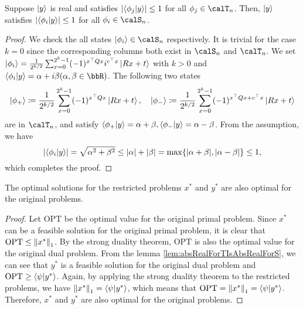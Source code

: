 \documentclass[\main/main]{subfiles}
\begin{document}
\begin{lemma}{\label{lem:absRealForTIsAbsRealForS}}
    Suppose $\ket{y}$ is real and satisfies $\abs{\braket{\phi_j}{y}} \leq 1$ for all $\phi_j \in \calT_n$.
    Then, $\ket{y}$ satisfies $\abs{\braket{\phi_i}{y}} \leq 1$ for all $\phi_i \in \calS_n$.
\end{lemma}
\begin{proof}
    We check the all states $\ket{\phi_i} \in \calS_n$ respectively.
    It is trivial for the case $k=0$ since the corresponding columns both exist in $\calS_n$ and $\calT_n$.
    We set $\ket{\phi_i} = \frac{1}{2^{k/2}}\sum_{x=0}^{2^k-1} (-1)^{x^\top Q x} i^{c^\top x} \ket{Rx+t}$ with $k>0$
    and $\braket{\phi_i}{y} = \alpha + i\beta (\alpha, \beta \in \bbR)$.
    The following two states
    \begin{equation*}
        \ket{\phi_+} \coloneqq \frac{1}{2^{k/2}}\sum_{x=0}^{2^k-1} (-1)^{x^\top Q x} \ket{Rx+t}, \quad
        \ket{\phi_-} \coloneqq \frac{1}{2^{k/2}}\sum_{x=0}^{2^k-1} (-1)^{x^\top Q x + c^\top x} \ket{Rx+t}
    \end{equation*}
    are in $\calT_n$, and satisfy $\braket{\phi_+}{y} = \alpha+\beta, \braket{\phi_-}{y} = \alpha-\beta$.
    From the assumption, we have
    \begin{equation*}
        \abs{\braket{\phi_i}{y}}
        =\sqrt{\alpha^2 + \beta^2}
        \leq \abs{\alpha}+\abs{\beta}
        = \max\{\abs{\alpha+\beta}, \abs{\alpha-\beta}\}
        \leq 1,
    \end{equation*}
    which completes the proof.
\end{proof}

\begin{theorem}
    The optimal solutions for the restricted problems $x^*$ and $y^*$ are also optimal for the original problems.
\end{theorem}
\begin{proof}
    Let $\mathrm{OPT}$ be the optimal value for the original primal problem.
    Since $x^*$ can be a feasible solution for the original primal problem, it is clear that $\mathrm{OPT} \leq \norm{x^*}_1$.
    By the strong duality theorem, $\mathrm{OPT}$ is also the optimal value for the original dual problem.
    From the lemma \ref{lem:absRealForTIsAbsRealForS},
    we can see that $y^*$ is a feasible solution for the original dual problem and $\mathrm{OPT} \geq \braket{\psi}{y^*}$.
    Again, by applying the strong duality theorem to the restricted problems,
    we have $\norm{x^*}_1 = \braket{\psi}{y^*}$, which means that $\mathrm{OPT} = \norm{x^*}_1 = \braket{\psi}{y^*}$.
    Therefore, $x^*$ and $y^*$ are also optimal for the original problems.
\end{proof}
\end{document}
